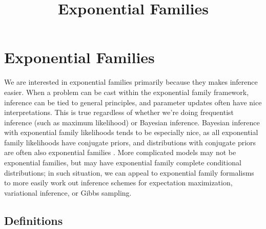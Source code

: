 \documentclass{article} %
\begin{document}


\title{Exponential Families} 

\maketitle
\tableofcontents
\newpage 

\section{Exponential Families} \label{sec:ef}

We are interested in  exponential families primarily because they makes inference easier.   When a problem can be cast within the exponential family framework,  inference can be tied to general principles,  and parameter updates often have nice interpretations.    This is true regardless of whether we're doing frequentist inference (such as maximum likelihood) or Bayesian inference.    Bayesian inference with exponential family likelihoods tends to be especially nice,  as all exponential family likelihoods have conjugate priors,  and distributions with conjugate priors are often also exponential families \cite{bernardo2009bayesian}.    More complicated models may not be exponential families,  but may have exponential family complete conditional distributions;  in such situation,  we can appeal to exponential family formalisms to more easily work out inference schemes for expectation maximization,  variational inference,  or Gibbs sampling.   

\subsection{Definitions}


\end{document}
